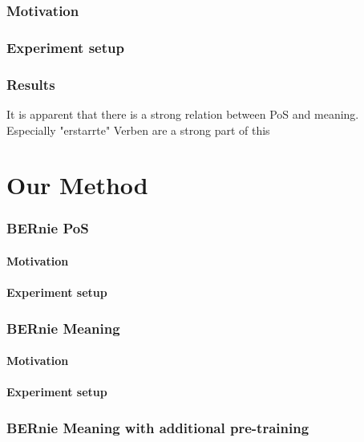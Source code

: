 \documentclass[a4paper,12pt,twoside,openright]{report}
\begin{document}
\subsection{Motivation}
\subsection{Experiment setup}
\subsection{Results}

It is apparent that there is a strong relation between PoS and meaning. 
Especially "erstarrte" Verben are a strong part of this

\chapter{Our Method}

\subsection{BERnie PoS}
\subsubsection{Motivation}
\subsubsection{Experiment setup}

\subsection{BERnie Meaning}
\subsubsection{Motivation}
\subsubsection{Experiment setup}

\subsection{BERnie Meaning with additional pre-training}
\end{document}
